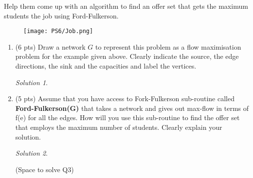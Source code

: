 \documentclass[12pt]{article}
\theoremstyle{remark}
\newtheorem*{solution}{Solution}
\begin{document}
\begin{enumerate}
Help them come up with an algorithm to find an offer set that gets the maximum students the job using Ford-Fulkerson.
\begin{figure}[h!]
\begin{center}
\texttt{[image: PS6/Job.png]}
\end{center}
\end{figure}

\begin{enumerate}
    \item (6 pts) Draw a network $G$ to represent this problem as a flow maximisation problem for the example given above. Clearly indicate the source, the edge directions, the sink and the capacities and label the vertices.
\begin{solution}

\end{solution}

    
    \item (5 pts) Assume that you have access to Fork-Fulkerson sub-routine called \textbf{Ford-Fulkerson(G)} that takes a network and gives out max-flow in terms of f(e) for all the edges. How will you use this sub-routine to find the offer set that employs the maximum number of students. Clearly explain your solution.

\begin{solution}

\end{solution}
\pagebreak
(Space to solve Q3)

\end{enumerate}

\end{enumerate}
\end{document}
